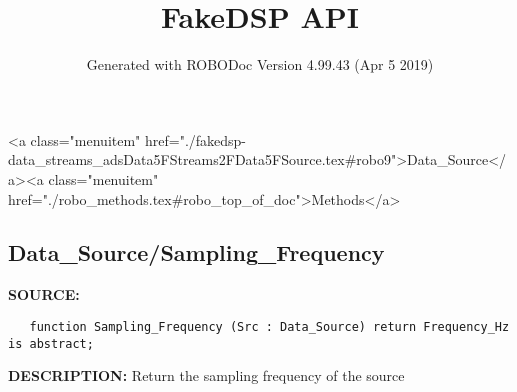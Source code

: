 \documentclass{article}
\title{FakeDSP API}
\author{Generated with ROBODoc Version 4.99.43 (Apr  5 2019)
}
\begin{document}
\maketitle
\printindex
\tableofcontents
\newpage

<a class="menuitem" href="./fakedsp-data_streams_adsData5FStreams2FData5FSource.tex#robo9">Data_Source</a><a class="menuitem" href="./robo_methods.tex#robo_top_of_doc">Methods</a>\subsection{Data\_Source/Sampling\_Frequency}
\textbf{SOURCE:}\hspace{0.08in}\begin{verbatim}
   function Sampling_Frequency (Src : Data_Source) return Frequency_Hz is abstract;
\end{verbatim}
\textbf{DESCRIPTION:}\hspace{0.08in}
   Return the sampling frequency of the source
\end{document}
